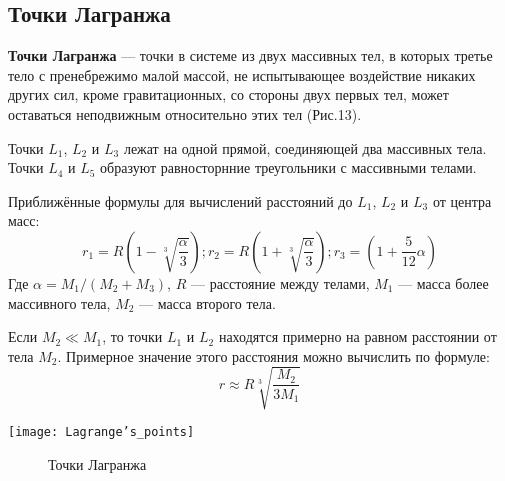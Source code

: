 \subsection{Точки Лагранжа}

\textbf{Точки Лагранжа} --- точки в системе из двух массивных тел, в которых третье тело с пренебрежимо малой массой, не испытывающее воздействие никаких других сил, кроме гравитационных, со стороны двух первых тел, может оставаться неподвижным относительно этих тел (Рис.13).

Точки $L_1$, $L_2$ и $L_3$ лежат на одной прямой, соединяющей два массивных тела. Точки $L_4$ и $L_5$ образуют равносторнние треугольники с массивными телами.

Приближённые формулы для вычислений расстояний до $L_1$, $L_2$ и $L_3$ от центра масс:
$$r_1=R\left(1-\sqrt[3]{\frac{\alpha}{3}}\right); r_2=R\left(1+\sqrt[3]{\frac{\alpha}{3}}\right); r_3=\left(1+\frac{5}{12}\alpha\right)$$
Где $\alpha=M_1/(M_2+M_3)$, $R$ --- расстояние между телами, $M_1$ --- масса более массивного тела, $M_2$ --- масса второго тела.

Если $M_2\ll M_1$, то точки $L_1$ и $L_2$ находятся примерно на равном расстоянии от тела $M_2$. Примерное значение этого расстояния можно вычислить по формуле:
$$r\approx R\sqrt[3]{\frac{M_2}{3M_1}}$$
\begin{center}
\texttt{[image: Lagrange's\_points]}
\begin{figure}[h!]
\caption{Точки Лагранжа}
\end{figure}
\end{center}